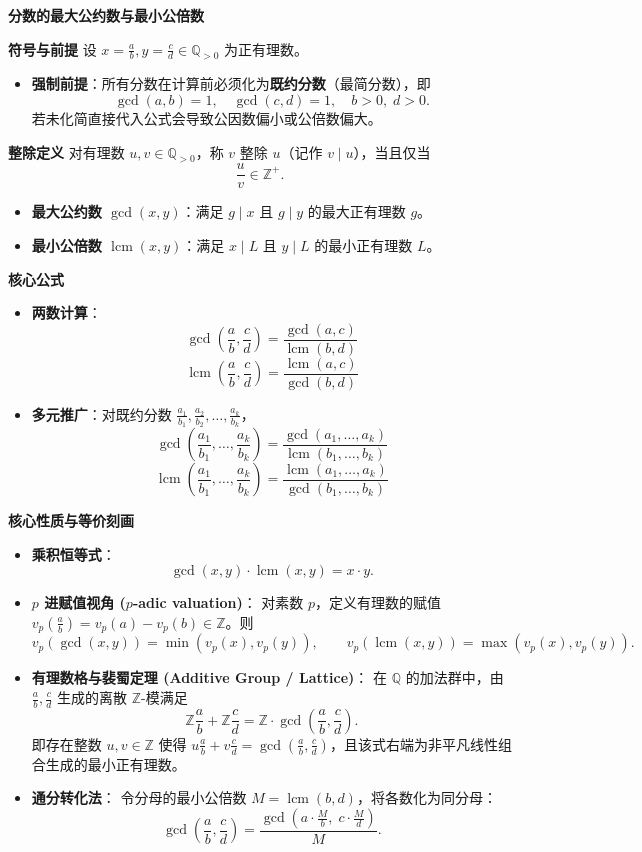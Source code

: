 \textbf{分数的最大公约数与最小公倍数}

\textbf{符号与前提}
设 $x = \frac{a}{b}, y = \frac{c}{d} \in \mathbb{Q}_{>0}$ 为正有理数。
\begin{itemize}
\item \textbf{强制前提}：所有分数在计算前必须化为\textbf{既约分数}（最简分数），即
\[
\gcd(a, b) = 1,\quad \gcd(c, d) = 1,\quad b > 0,\; d > 0.
\]
若未化简直接代入公式会导致公因数偏小或公倍数偏大。
\end{itemize}

\textbf{整除定义}
对有理数 $u, v \in \mathbb{Q}_{>0}$，称 $v$ 整除 $u$（记作 $v \mid u$），当且仅当
\[
\frac{u}{v} \in \mathbb{Z}^+.
\]
\begin{itemize}
\item \textbf{最大公约数 $\gcd(x, y)$}：满足 $g \mid x$ 且 $g \mid y$ 的最大正有理数 $g$。
\item \textbf{最小公倍数 $\operatorname{lcm}(x, y)$}：满足 $x \mid L$ 且 $y \mid L$ 的最小正有理数 $L$。
\end{itemize}

\textbf{核心公式}
\begin{itemize}
\item \textbf{两数计算}：
\[
\gcd\left(\frac{a}{b}, \frac{c}{d}\right) = \frac{\gcd(a, c)}{\operatorname{lcm}(b, d)}
\]
\[
\operatorname{lcm}\left(\frac{a}{b}, \frac{c}{d}\right) = \frac{\operatorname{lcm}(a, c)}{\gcd(b, d)}
\]
\item \textbf{多元推广}：对既约分数 $\frac{a_1}{b_1}, \frac{a_2}{b_2}, \dots, \frac{a_k}{b_k}$，
\[
\gcd\left(\frac{a_1}{b_1}, \dots, \frac{a_k}{b_k}\right) = \frac{\gcd(a_1, \dots, a_k)}{\operatorname{lcm}(b_1, \dots, b_k)}
\]
\[
\operatorname{lcm}\left(\frac{a_1}{b_1}, \dots, \frac{a_k}{b_k}\right) = \frac{\operatorname{lcm}(a_1, \dots, a_k)}{\gcd(b_1, \dots, b_k)}
\]
\end{itemize}

\textbf{核心性质与等价刻画}
\begin{itemize}
\item \textbf{乘积恒等式}：
\[
\gcd(x, y) \cdot \operatorname{lcm}(x, y) = x \cdot y.
\]
\item \textbf{$p$ 进赋值视角 ($p$-adic valuation)}：
对素数 $p$，定义有理数的赋值 $v_p\left(\frac{a}{b}\right) = v_p(a) - v_p(b) \in \mathbb{Z}$。则
\[
v_p(\gcd(x, y)) = \min(v_p(x), v_p(y)),\qquad v_p(\operatorname{lcm}(x, y)) = \max(v_p(x), v_p(y)).
\]
\item \textbf{有理数格与裴蜀定理 (Additive Group / Lattice)}：
在 $\mathbb{Q}$ 的加法群中，由 $\frac{a}{b}, \frac{c}{d}$ 生成的离散 $\mathbb{Z}$-模满足
\[
\mathbb{Z}\frac{a}{b} + \mathbb{Z}\frac{c}{d} = \mathbb{Z}\cdot \gcd\left(\frac{a}{b}, \frac{c}{d}\right).
\]
即存在整数 $u, v \in \mathbb{Z}$ 使得 $u\frac{a}{b} + v\frac{c}{d} = \gcd\left(\frac{a}{b}, \frac{c}{d}\right)$，且该式右端为非平凡线性组合生成的最小正有理数。
\item \textbf{通分转化法}：
令分母的最小公倍数 $M = \operatorname{lcm}(b, d)$，将各数化为同分母：
\[
\gcd\left(\frac{a}{b}, \frac{c}{d}\right) = \frac{\gcd\left(a \cdot \frac{M}{b},\; c \cdot \frac{M}{d}\right)}{M}.
\]
\end{itemize}

